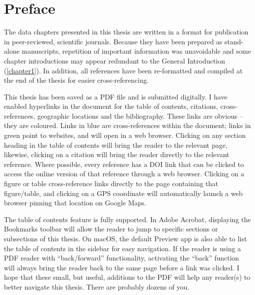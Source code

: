 
\cleardoublepage

\SingleSpacing

\chapter{Preface}

\OnehalfSpacing

The data chapters presented in this thesis are written in a format for publication in peer-reviewed, scientific journals. 
Because they have been prepared as stand-alone manuscripts, repetition of important information was unavoidable and some chapter introductions may appear redundant to the General Introduction (\autoref{chapter1}).
In addition, all references have been re-formatted and compiled at the end of the thesis for easier cross-referencing.

This thesis has been saved as a PDF file and is submitted digitally. I have enabled hyperlinks in the document for the table of contents, citations, cross-references, geographic locations and the bibliography. 
These links are obvious -- they are coloured. Links in {\color{ref} blue} are cross-references within the document; links in {\color{url} green} point to websites, and will open in a web browser.
Clicking on any section heading in the table of contents will bring the reader to the relevant page, likewise, clicking on a citation will bring the reader directly to the relevant reference.
Where possible, every reference has a DOI link that can be clicked to access the online version of that reference through a web browser.
Clicking on a figure or table cross-reference links directly to the page containing that figure/table, and clicking on a GPS coordinate will automatically launch a web browser pinning that location on Google Maps.

The table of contents feature is fully supported. In Adobe Acrobat, displaying the Bookmarks toolbar will allow the reader to jump to specific sections or subsections of this thesis. On macOS, the default Preview app is also able to list the table of contents in the sidebar for easy navigation. If the reader is using a PDF reader with ``back/forward'' functionality, activating the ``back'' function will always bring the reader back to the same page before a link was clicked.
I hope that these small, but useful, additions to the PDF will help any reader(s) to better navigate this thesis.
There are probably dozens of you.

\mainmatter

\setlength{\parindent}{0em} %

\hypersetup{linkcolor=black} %
